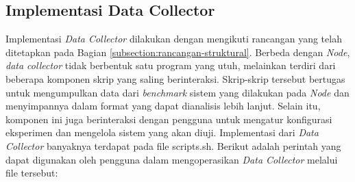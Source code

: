 \subsection{Implementasi Data Collector}
\label{subsection:implementasi-data-collector}

Implementasi \textit{Data Collector} dilakukan dengan mengikuti rancangan yang telah ditetapkan pada Bagian \ref{subsection:rancangan-struktural}. Berbeda dengan \textit{Node}, \textit{data collector} tidak berbentuk satu program yang utuh, melainkan terdiri dari beberapa komponen skrip yang saling berinteraksi. Skrip-skrip tersebut bertugas untuk mengumpulkan data dari \textit{benchmark} sistem yang dilakukan pada \textit{Node} dan menyimpannya dalam format yang dapat dianalisis lebih lanjut. Selain itu, komponen ini juga berinteraksi dengan pengguna untuk mengatur konfigurasi eksperimen dan mengelola sistem yang akan diuji. Implementasi dari \textit{Data Collector} banyaknya terdapat pada file scripts.sh. Berikut adalah perintah yang dapat digunakan oleh pengguna dalam mengoperasikan \textit{Data Collector} melalui file tersebut:

